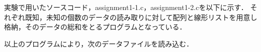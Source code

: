 実験で用いたソースコード，assignment1-1.c，assignment1-2.cを以下に示す．
それぞれ既知，未知の個数のデータの読み取りに対して配列と線形リストを用意し格納，そのデータの総和をとるプログラムとなっている．


以上のプログラムにより，次のデータファイルを読み込む．


